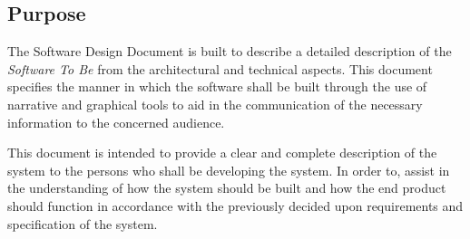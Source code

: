 \subsection{Purpose}
The Software Design Document is built to describe a detailed description of the \emph{Software To Be} from the architectural and technical aspects. This document specifies the manner in which the software shall be built through the use of narrative and graphical tools to aid in the communication of the necessary information to the concerned audience.

This document is intended to provide a clear and complete description of the system to the persons who shall be developing the system. In order to, assist in the understanding of how the system should be built and how the end product should function in accordance with the previously decided upon requirements and specification of the system.
